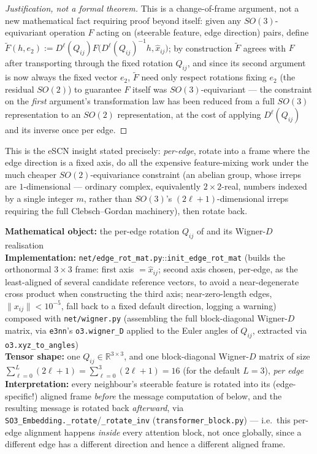 \documentclass[11pt,a4paper]{report}
\theoremstyle{definition}
\theoremstyle{remark}
\newcommand{\RR}{\mathbb R}
\newcommand{\file}[1]{\texttt{#1}}
\newcommand{\pyfunc}[1]{\texttt{#1}}
\begin{document}
\begin{proof}[Justification, not a formal theorem]
This is a change-of-frame argument, not a new mathematical fact requiring
proof beyond  itself: given any
$SO(3)$-equivariant operation $F$ acting on (steerable feature, edge
direction) pairs, define $\widetilde F(h,e_2) := D^\ell(Q_{ij})F\bigl(D^\ell(Q_{ij})^{-1}h,\hat x_{ij}\bigr)$;
by construction $\widetilde F$ agrees with $F$ after transporting through
the fixed rotation $Q_{ij}$, and since its second argument is now always
the fixed vector $e_2$, $\widetilde F$ need only respect rotations fixing
$e_2$ (the residual $SO(2)$) to guarantee $F$ itself was $SO(3)$-equivariant
--- the constraint on the \emph{first} argument's transformation law has
been reduced from a full $SO(3)$ representation to an $SO(2)$
representation, at the cost of applying $D^\ell(Q_{ij})$ and its inverse
once per edge.
\end{proof}

This is the eSCN insight stated precisely: \emph{per-edge}, rotate into a
frame where the edge direction is a fixed axis, do all the expensive
feature-mixing work under the much cheaper $SO(2)$-equivariance constraint
(an abelian group, whose irreps are $1$-dimensional --- ordinary complex,
equivalently $2\times2$-real, numbers indexed by a single integer $m$,
rather than $SO(3)$'s $(2\ell+1)$-dimensional irreps requiring the full
Clebsch--Gordan machinery), then rotate back.

\begin{codebox}
\textbf{Mathematical object:} the per-edge rotation $Q_{ij}$ of
 and its Wigner-$D$ realisation \\
\textbf{Implementation:} \file{net/edge\_rot\_mat.py}::\pyfunc{init\_edge\_rot\_mat}
(builds the orthonormal $3\times3$ frame: first axis $=\hat x_{ij}$; second
axis chosen, per-edge, as the least-aligned of several candidate reference
vectors, to avoid a near-degenerate cross product when constructing the
third axis; near-zero-length edges, $\|x_{ij}\|<10^{-5}$, fall back to a
fixed default direction, logging a warning) composed with
\file{net/wigner.py} (assembling the full block-diagonal Wigner-$D$ matrix,
via \texttt{e3nn}'s \texttt{o3.wigner\_D} applied to the Euler angles of
$Q_{ij}$, extracted via \texttt{o3.xyz\_to\_angles}) \\
\textbf{Tensor shape:} one $Q_{ij}\in\RR^{3\times3}$, and one block-diagonal
Wigner-$D$ matrix of size $\sum_{\ell=0}^L(2\ell+1)=\sum_{\ell=0}^3(2\ell+1)=16$
(for the default $L=3$), \emph{per edge} \\
\textbf{Interpretation:} every neighbour's steerable feature is rotated
into its (edge-specific!) aligned frame \emph{before} the message
computation of  below, and the resulting message is
rotated back \emph{afterward}, via
\pyfunc{SO3\_Embedding.\_rotate}/\pyfunc{\_rotate\_inv}
(\file{transformer\_block.py}) --- i.e.\ this per-edge alignment happens
\emph{inside} every attention block, not once globally, since a different
edge has a different direction and hence a different aligned frame.
\end{codebox}
\end{document}
